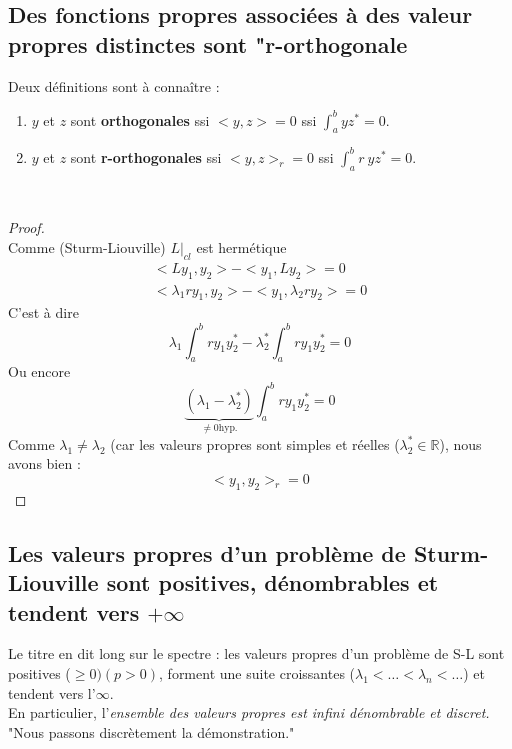 \documentclass[british,french,11pt, a4paper, openany]{book}
\begin{document}
		\subsection{Des fonctions propres associées à des valeur propres distinctes sont "r-orthogonale}
		Deux définitions sont à connaître
		:
		\begin{enumerate}
			\item $y$ et $z$ sont \textbf{orthogonales} ssi $<y,z> = 0$ ssi $ \int_a^b yz^* = 0.$
			\item $y$ et $z$ sont \textbf{r-orthogonales} ssi $<y,z>_r = 0$ ssi $ \int_a^b r\ yz^* = 0.$
		\end{enumerate}\ \\
													
		\begin{proof}
			\ \\
			Comme (Sturm-Liouville) $L|_{cl}$ est hermétique
			\begin{eqnarray}
				<Ly_1,y_2> - <y_1,Ly_2> = 0\\
				<\lambda_1 ry_1,y_2> - <y_1, \lambda_2 ry_2>  =0
			\end{eqnarray}
			C'est à dire
			\begin{equation}
				\lambda_1\int_a^b ry_1y_2^* - \lambda_2^* \int_a^b ry_1y_2^* = 0
			\end{equation}
			Ou encore
			\begin{equation}
				\underbrace{(\lambda_1 - \lambda_2^*)}_{\neq 0 \text{hyp.}}\int_a^b r y_1y_2^* = 0
			\end{equation}
			Comme $\lambda_1 \neq \lambda_2$ (car les valeurs propres sont simples et réelles ($\lambda_2^* \in \mathbb{R}$), nous avons bien :
			\begin{equation}
				<y_1,y_2>_r = 0
			\end{equation}
		\end{proof}
													
													
		\subsection{Les valeurs propres d'un problème de Sturm-Liouville sont positives, dénombrables et tendent vers $+\infty$}
		Le titre en dit long sur le spectre : les valeurs propres d'un  problème de S-L sont positives ($\geq 0)(p>0)$, forment une suite croissantes ($\lambda_1 < \dots < \lambda_n < \dots$) et tendent vers l'$\infty$.\\
		En particulier, l'\textit{ensemble des valeurs propres est infini dénombrable et discret.}\\
		"Nous passons discrètement la démonstration."
													
\end{document}
